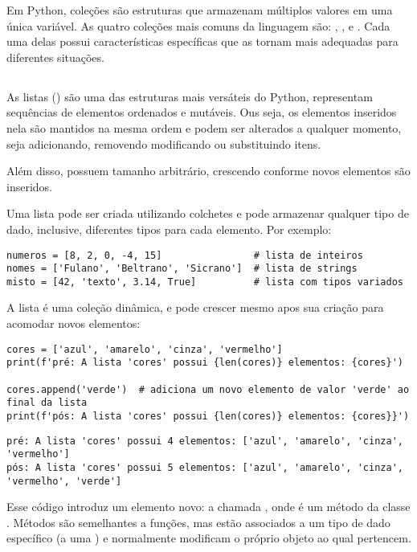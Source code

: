 Em Python, coleções são estruturas que armazenam múltiplos valores em uma única variável.
As quatro coleções mais comuns da linguagem são: , ,  e .
Cada uma delas possui características específicas que as tornam mais adequadas para diferentes situações.



\subsection{}
As listas () são uma das estruturas mais versáteis do Python, representam sequências de elementos
ordenados e mutáveis.
Ous seja, os elementos inseridos nela são mantidos na mesma ordem e podem ser alterados a qualquer momento,
seja adicionando, removendo modificando ou substituindo itens.

Além disso, possuem tamanho arbitrário, crescendo conforme novos elementos são inseridos.

Uma lista pode ser criada utilizando colchetes \inlcode{[]} e pode armazenar qualquer tipo de dado, inclusive, diferentes tipos para cada elemento.
Por exemplo:
\begin{verbatim}
numeros = [8, 2, 0, -4, 15]                # lista de inteiros
nomes = ['Fulano', 'Beltrano', 'Sicrano']  # lista de strings
misto = [42, 'texto', 3.14, True]          # lista com tipos variados
\end{verbatim}

A lista é uma coleção dinâmica, e pode crescer mesmo apos sua criação para acomodar novos elementos:
\begin{verbatim}
cores = ['azul', 'amarelo', 'cinza', 'vermelho']
print(f'pré: A lista 'cores' possui {len(cores)} elementos: {cores}')

cores.append('verde')  # adiciona um novo elemento de valor 'verde' ao final da lista
print(f'pós: A lista 'cores' possui {len(cores)} elementos: {cores}}')
\end{verbatim}
\begin{verbatim}
pré: A lista 'cores' possui 4 elementos: ['azul', 'amarelo', 'cinza', 'vermelho']
pós: A lista 'cores' possui 5 elementos: ['azul', 'amarelo', 'cinza', 'vermelho', 'verde']
\end{verbatim}

Esse código introduz um elemento novo: a chamada , onde  é um método da classe
.
Métodos são semelhantes a funções, mas estão associados a um tipo de dado específico (a uma ) e
normalmente modificam o próprio objeto ao qual pertencem.

